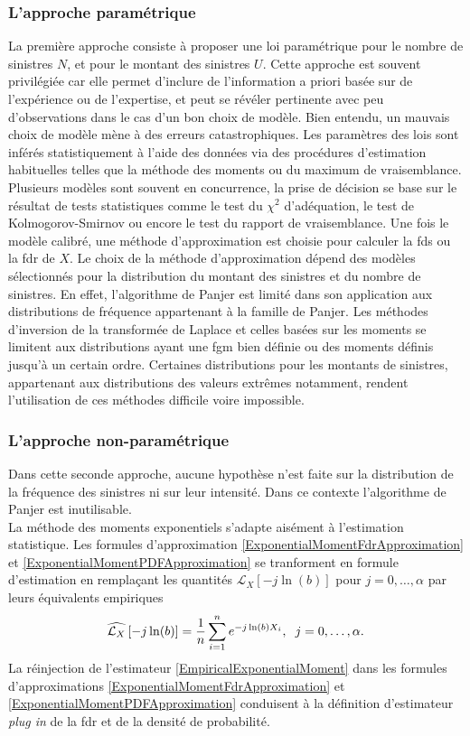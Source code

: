 \subsubsection{L'approche paramétrique}
La première approche consiste à proposer une loi paramétrique pour le nombre de sinistres $N$, et pour le montant des sinistres $U$. Cette approche est souvent privilégiée car elle permet d'inclure de l'information a priori basée sur de l'expérience ou de l'expertise, et peut se révéler pertinente avec peu d'observations dans le cas d'un bon choix de modèle. Bien entendu, un mauvais choix de modèle mène à des erreurs catastrophiques. Les paramètres des lois sont inférés statistiquement à l'aide des données via des procédures d'estimation habituelles telles que la méthode des moments ou du maximum de vraisemblance. Plusieurs modèles sont souvent en concurrence, la prise de décision se base sur le résultat de tests statistiques comme le test du $\chi^{2}$ d'adéquation, le test de Kolmogorov-Smirnov ou encore le test du rapport de vraisemblance. Une fois le modèle calibré, une méthode d'approximation est choisie pour calculer la \gls{fds} ou la \gls{fdr} de $X$. Le choix de la méthode d'approximation dépend des modèles sélectionnés pour la distribution du montant des sinistres et du nombre de sinistres. En effet, l'algorithme de Panjer est limité dans son application aux distributions de fréquence appartenant à la famille de Panjer. Les méthodes d'inversion de la transformée de Laplace et celles basées sur les moments se limitent aux distributions ayant une \gls{fgm} bien définie ou des moments définis jusqu'à un certain ordre. Certaines distributions pour les montants de sinistres, appartenant aux distributions des valeurs extrêmes notamment, rendent l'utilisation de ces méthodes difficile voire impossible. 
\subsubsection{L'approche non-paramétrique}
Dans cette seconde approche, aucune hypothèse n'est faite sur la distribution de la fréquence des sinistres ni sur leur intensité. Dans ce contexte l'algorithme de Panjer est inutilisable.\\

La méthode des moments exponentiels s'adapte aisément à l'estimation statistique. Les formules d'approximation \eqref{ExponentialMomentFdrApproximation} et \eqref{ExponentialMomentPDFApproximation} se tranforment en formule d'estimation en remplaçant les quantités $\mathcal{L}_{X}\left[-j\ln(b)\right]$ pour $j=0,\ldots,\alpha$ par leurs équivalents empiriques 
\begin{equation}\label{EmpiricalExponentialMoment}
\widehat{\mathcal{L}_{X}}\left[-j\ln(b)\right]= \frac{1}{n}\sum_{i=1}^{n}e^{-j\ln(b)X_{i}},\hspace{0.2cm}j=0,\ldots,\alpha.
\end{equation}
La réinjection de l'estimateur \eqref{EmpiricalExponentialMoment} dans les formules d'approximations \eqref{ExponentialMomentFdrApproximation} et \eqref{ExponentialMomentPDFApproximation} conduisent à la définition d'estimateur \textit{plug in} de la \gls{fdr} et de la densité de probabilité.\\ 

